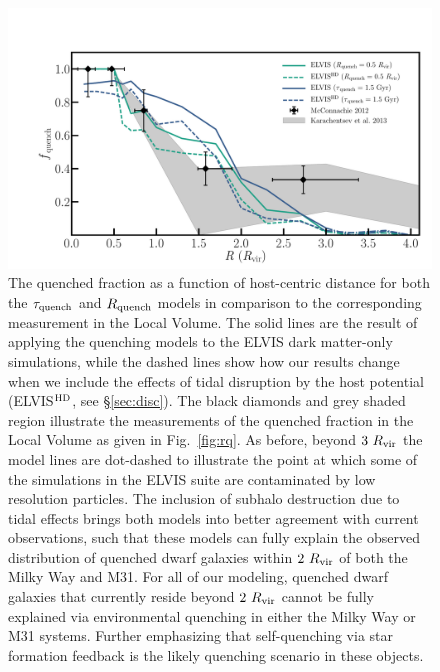 \documentclass[usenatbib]{mnras}
\newcommand{\rvir}{R_{\rm vir}}
\begin{document}

\begin{figure}
 \centering
 \hspace*{-0.1in}
 \includegraphics[width=6in]{fig4.pdf}
 \caption{The quenched fraction as a function of host-centric distance for both
   the $\tau_{\rm quench}$ and $R_{\rm quench}$ models in comparison to the
   corresponding measurement in the Local Volume. The solid lines are the result
   of applying the quenching models to the ELVIS dark matter-only simulations,
   while the dashed lines show how our results change when we include the
   effects of tidal disruption by the host potential (ELVIS$^{\rm HD}$, see
   \S\ref{sec:disc}). The black diamonds and grey shaded region illustrate the
   measurements of the quenched fraction in the Local Volume as given in
   Fig.~\ref{fig:rq}.
   As before, beyond $3~\rvir$ the model lines are dot-dashed to illustrate the
   point at which some of the simulations in the ELVIS suite are
   contaminated by low resolution particles.
   The inclusion of subhalo destruction due to tidal effects
   brings both models into better agreement with current observations, such that
   these models can fully explain the observed distribution of quenched dwarf
   galaxies within $2~\rvir$ of both the Milky Way and M31.
   For all of our modeling, quenched dwarf galaxies that currently
   reside beyond $2~\rvir$ cannot be fully explained via environmental
   quenching in either the Milky Way or M31 systems. Further
   emphasizing that self-quenching via star formation feedback is the
   likely quenching scenario in these objects. }
 \label{fig:destruct}
\end{figure}

\end{document}
